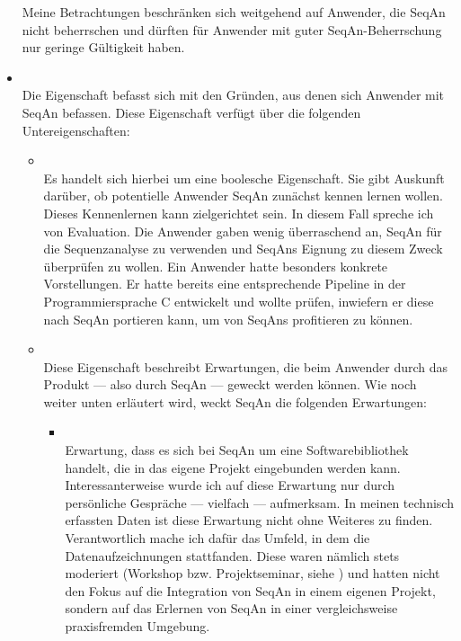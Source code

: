 \begin{itemize}
  Meine Betrachtungen beschränken sich weitgehend auf Anwender, die SeqAn nicht beherrschen und dürften für Anwender mit guter SeqAn-Beherrschung nur geringe Gültigkeit haben.
  
  \item[\codebullet{apiua://code/-9223372036854775599}] \textbf{} \\
  Die Eigenschaft befasst sich mit den Gründen, aus denen sich Anwender mit SeqAn befassen. Diese Eigenschaft verfügt über die folgenden Untereigenschaften:
  
  \begin{itemize}
    \item[\codebullet{apiua://code/-9223372036854775407}] \textbf{} \\
    Es handelt sich hierbei um eine boolesche Eigenschaft. Sie gibt Auskunft darüber, ob potentielle Anwender SeqAn zunächst kennen lernen wollen. Dieses Kennenlernen kann zielgerichtet sein. In diesem Fall spreche ich von Evaluation. Die Anwender gaben wenig überraschend an, SeqAn für die Sequenzanalyse zu verwenden und SeqAns Eignung zu diesem Zweck überprüfen zu wollen. Ein Anwender hatte besonders konkrete Vorstellungen. Er hatte bereits eine entsprechende Pipeline in der Programmiersprache C entwickelt und wollte prüfen, inwiefern er diese nach SeqAn portieren kann, um von SeqAns  profitieren zu können.
    
    \item[\codebullet{apiua://code/-9223372036854774827}] \textbf{} \\
    Diese Eigenschaft beschreibt Erwartungen, die beim Anwender durch das Produkt --- also durch SeqAn --- geweckt werden können. Wie noch weiter unten erläutert wird, weckt SeqAn die folgenden Erwartungen:
    
    \begin{itemize}
      \item[\codebullet{apiua://code/-9223372036854774830}] \textbf{} \\
      Erwartung, dass es sich bei SeqAn um eine Softwarebibliothek handelt, die in das eigene Projekt eingebunden werden kann. Interessanterweise wurde ich auf diese Erwartung nur durch persönliche Gespräche --- vielfach --- aufmerksam. In meinen technisch erfassten Daten ist diese Erwartung nicht ohne Weiteres zu finden. Verantwortlich mache ich dafür das Umfeld, in dem die Datenaufzeichnungen stattfanden. Diese waren nämlich stets moderiert (Workshop bzw. Projektseminar, siehe ) und hatten nicht den Fokus auf die Integration von SeqAn in einem eigenen Projekt, sondern auf das Erlernen von SeqAn in einer vergleichsweise praxisfremden Umgebung.
      

\end{itemize}
\end{itemize}
\end{itemize}
